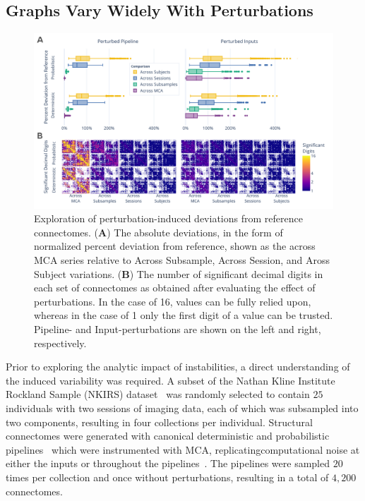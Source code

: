\documentclass[fleqn,10pt]{SelfArx} %
\begin{document}
\subsection*{Graphs Vary Widely With Perturbations}
\begin{figure}[hbt]\centering
\includegraphics[width=0.98\linewidth]{figures/fig1_absolute_differences.pdf}
\caption{Exploration of perturbation-induced deviations from reference connectomes.
(\textbf{A}) The absolute deviations, in the form of normalized percent deviation from reference, shown as the
across MCA series relative to Across Subsample, Across Session, and Aross Subject variations.
(\textbf{B}) The number of significant decimal digits in each set of connectomes as obtained after evaluating the
effect of perturbations. In the case of 16, values can be fully relied upon, whereas in the case of 1 only the first
digit of a value can be trusted. Pipeline- and Input-perturbations are shown on the left and right, respectively.}
\label{fig:absolute}
\end{figure}

Prior to exploring the analytic impact of instabilities, a direct understanding of the induced variability was
required. A subset of the Nathan Kline Institute Rockland Sample (NKIRS) dataset~\cite{Nooner2012-eg} was randomly
selected to contain $25$ individuals with two sessions of imaging data, each of which was subsampled into two
components, resulting in four collections per individual. Structural connectomes were generated with canonical
deterministic and probabilistic pipelines~\cite{Garyfallidis2014-ql,Garyfallidis2012-gg} which were instrumented with
MCA, replicatingcomputational noise at either the inputs or throughout the pipelines~\cite{Denis2016-wo,Kiar2020-lb}.
The pipelines were sampled $20$ times per collection and once without perturbations, resulting in a total of $4,200$
connectomes.
\end{document}
